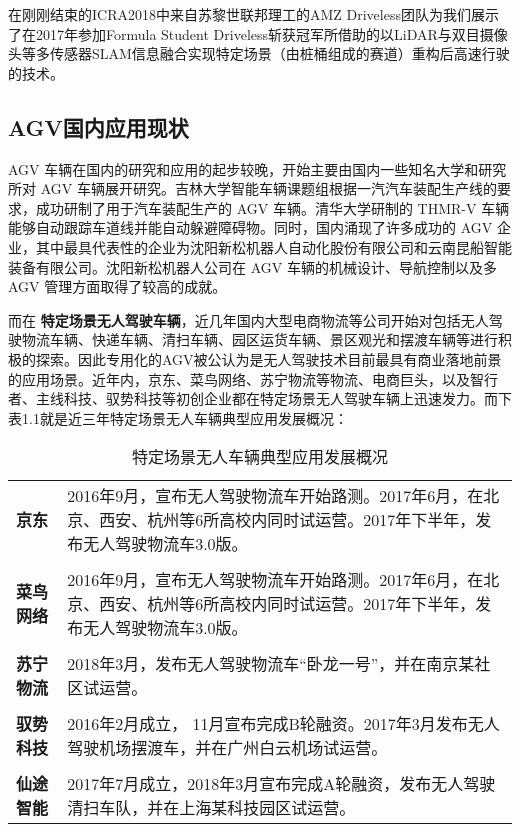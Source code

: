 在刚刚结束的ICRA2018中来自苏黎世联邦理工的AMZ Driveless团队为我们展示了在2017年参加Formula Student Driveless斩获冠军所借助的以LiDAR与双目摄像头等多传感器SLAM信息融合实现特定场景（由桩桶组成的赛道）重构后高速行驶的技术。

\subsection{AGV国内应用现状}

AGV 车辆在国内的研究和应用的起步较晚，开始主要由国内一些知名大学和研究所对 AGV 车辆展开研究。吉林大学智能车辆课题组根据一汽汽车装配生产线的要求，成功研制了用于汽车装配生产的 AGV 车辆。清华大学研制的 THMR-V 车辆能够自动跟踪车道线并能自动躲避障碍物。同时，国内涌现了许多成功的 AGV 企业，其中最具代表性的企业为沈阳新松机器人自动化股份有限公司和云南昆船智能装备有限公司。沈阳新松机器人公司在 AGV 车辆的机械设计、导航控制以及多 AGV 管理方面取得了较高的成就。

而在 \textbf{特定场景无人驾驶车辆}，近几年国内大型电商物流等公司开始对包括无人驾驶物流车辆、快递车辆、清扫车辆、园区运货车辆、景区观光和摆渡车辆等进行积极的探索。因此专用化的AGV被公认为是无人驾驶技术目前最具有商业落地前景的应用场景。近年内，京东、菜鸟网络、苏宁物流等物流、电商巨头，以及智行者、主线科技、驭势科技等初创企业都在特定场景无人驾驶车辆上迅速发力。而下表1.1就是近三年特定场景无人车辆典型应用发展概况：

\begin{table}[htbp]
	\centering%
	\caption[centering]{特定场景无人车辆典型应用发展概况}%
	\label{共享单车日均使用总量与对应时间段的共享单车数量}%
	\begin{tabular}{C{2cm}p{10cm}}	
		\toprule
		 & \\ 
		\midrule
		\textbf{京东} & 2016年9月，宣布无人驾驶物流车开始路测。2017年6月，在北京、西安、杭州等6所高校内同时试运营。2017年下半年，发布无人驾驶物流车3.0版。 \\
		\\
		\textbf{菜鸟网络} & 2016年9月，宣布无人驾驶物流车开始路测。2017年6月，在北京、西安、杭州等6所高校内同时试运营。2017年下半年，发布无人驾驶物流车3.0版。 \\
		\\
		\textbf{苏宁物流} & 2018年3月，发布无人驾驶物流车“卧龙一号”，并在南京某社区试运营。 \\
		\\
		\textbf{驭势科技} & 2016年2月成立， 11月宣布完成B轮融资。2017年3月发布无人驾驶机场摆渡车，并在广州白云机场试运营。 \\
		\\
		\textbf{仙途智能} & 2017年7月成立，2018年3月宣布完成A轮融资，发布无人驾驶清扫车队，并在上海某科技园区试运营。\\
		\bottomrule
	\end{tabular}
\end{table}

